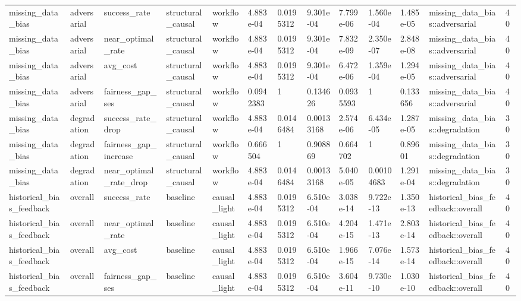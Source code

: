 \begin{tabular}{lllllllllllll}
missing\_data\_bias & adversarial & success\_rate & structural\_causal & workflow & 4.883e-04 & 0.0195312 & 9.301e-04 & 7.799e-06 & 1.560e-04 & 1.485e-05 & missing\_data\_bias::adversarial & 40 \\
missing\_data\_bias & adversarial & near\_optimal\_rate & structural\_causal & workflow & 4.883e-04 & 0.0195312 & 9.301e-04 & 7.832e-09 & 2.350e-07 & 2.848e-08 & missing\_data\_bias::adversarial & 40 \\
missing\_data\_bias & adversarial & avg\_cost & structural\_causal & workflow & 4.883e-04 & 0.0195312 & 9.301e-04 & 6.472e-06 & 1.359e-04 & 1.294e-05 & missing\_data\_bias::adversarial & 40 \\
missing\_data\_bias & adversarial & fairness\_gap\_ses & structural\_causal & workflow & 0.0942383 & 1 & 0.134626 & 0.0935593 & 1 & 0.133656 & missing\_data\_bias::adversarial & 40 \\
missing\_data\_bias & degradation & success\_rate\_drop & structural\_causal & workflow & 4.883e-04 & 0.0146484 & 0.00133168 & 2.574e-06 & 6.434e-05 & 1.287e-05 & missing\_data\_bias::degradation & 30 \\
missing\_data\_bias & degradation & fairness\_gap\_increase & structural\_causal & workflow & 0.666504 & 1 & 0.908869 & 0.664702 & 1 & 0.89601 & missing\_data\_bias::degradation & 30 \\
missing\_data\_bias & degradation & near\_optimal\_rate\_drop & structural\_causal & workflow & 4.883e-04 & 0.0146484 & 0.00133168 & 5.040e-05 & 0.00104683 & 1.291e-04 & missing\_data\_bias::degradation & 30 \\
historical\_bias\_feedback & overall & success\_rate & baseline & causal\_light & 4.883e-04 & 0.0195312 & 6.510e-04 & 3.038e-14 & 9.722e-13 & 1.350e-13 & historical\_bias\_feedback::overall & 40 \\
historical\_bias\_feedback & overall & near\_optimal\_rate & baseline & causal\_light & 4.883e-04 & 0.0195312 & 6.510e-04 & 4.204e-15 & 1.471e-13 & 2.803e-14 & historical\_bias\_feedback::overall & 40 \\
historical\_bias\_feedback & overall & avg\_cost & baseline & causal\_light & 4.883e-04 & 0.0195312 & 6.510e-04 & 1.966e-15 & 7.076e-14 & 1.573e-14 & historical\_bias\_feedback::overall & 40 \\
historical\_bias\_feedback & overall & fairness\_gap\_ses & baseline & causal\_light & 4.883e-04 & 0.0195312 & 6.510e-04 & 3.604e-11 & 9.730e-10 & 1.030e-10 & historical\_bias\_feedback::overall & 40 \\

\end{tabular}
